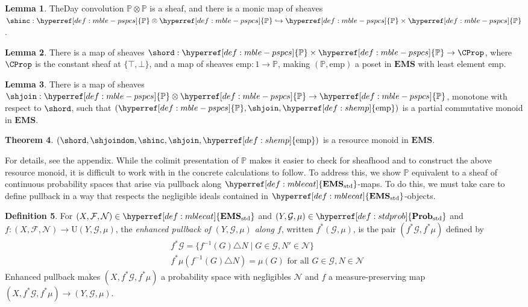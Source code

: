 \documentclass[
  sigconf,
  screen, ]{acmart}
\makeatletter
\theoremstyle{definition}
\newtheorem{theorem}{Theorem}[section]
\newtheorem{lemma}[theorem]{Lemma}
\newtheorem{definition}[theorem]{Definition}
\newcommand\calF{\mathcal F}
\newcommand\calG{\mathcal G}
\newcommand\calN{\mathcal N}
\newcommand{\labelword}[2]{\phantomsection
  #1\def\@currentlabel{\unexpanded{#1}}\label{#2}}
\newcommand\appref[1]{the appendix}
\newcommand\appref[1]{\cref{#1}}
\newcommand\nref[2]{\hyperref[#1]{#2}} \newcommand\checkhigh{{\huge{\color{red}\textbf{TODO: check}}}}
\newcommand\vtrue{\top}
\newcommand\vfalse{\bot}
\newcommand\texforgetmu{\mathrm{U}}
\newcommand\forgetmu{{\nref{def:forgetmu}{\texforgetmu}}}
\newcommand\goodsheafcat{\mathbf{EMS}}
\newcommand\texStdProb{\mathbf{Prob}_{\rm std}}
\newcommand\StdProb{{\nref{def:stdprob}{\texStdProb}}}
\newcommand\texStdMble{\mathbf{EMS}_{\rm std}}
\newcommand\StdMble{{\nref{def:mblecat}{\texStdMble}}}
\newcommand\texpspcs{\mathbb P}
\newcommand\pspcs{{\nref{def:mble-pspcs}{\texpspcs}}}
\newcommand\sheafcat{{\nref{def:sheafcat}{\goodsheafcat}}}
\makeatother
\begin{document}
\begin{lemma}
  \labelword{The}{def:shinc} Day convolution $\pspcs\otimes\pspcs$
  is a sheaf, and there is a monic map of sheaves $\shinc : \pspcs\otimes\pspcs
  \hookrightarrow \pspcs\times\pspcs$.
\end{lemma}

\newcommand\shemp{{\nref{def:shemp}{\mathrm{emp}}}}
\begin{lemma} \label{def:shord}
  \labelword{There}{def:shemp} is a map of sheaves $\shord : \pspcs\times\pspcs\to\CProp$,
  \labelword{where}{def:CProp} $\CProp$ is the constant sheaf at $\{\vtrue,\vfalse\}$,
  and a map of sheaves $\shemp : 1\to\pspcs$,
  making $(\pspcs,\shemp)$ a poset in $\sheafcat$ with least element $\shemp$.
\end{lemma}

\begin{lemma} \label{def:shjoin}
  There is a map of sheaves $\shjoin : \pspcs\otimes\pspcs\to\pspcs$,
  monotone with respect to $\shord$,
  such that $(\pspcs,\shjoin,\shemp)$ is a partial commutative monoid in $\sheafcat$.
\end{lemma}

\begin{theorem} \label{def:sheafresourcemonoid}
  $(\shord,\shjoindom,\shinc,\shjoin,\shemp)$
  is a resource monoid in $\sheafcat$.
\end{theorem}

For details, see \appref{app:sec:goodsheaves}.
While the colimit presentation of $\pspcs$ makes it easier to check for sheafhood
and to construct the above resource monoid,
it is difficult to work with in the concrete calculations to follow.
To address this, we show $\pspcs$ equivalent to a sheaf of continuous probability spaces
that arise via pullback along $\StdMble$-maps.
To do this,
we must take care to define pullback in a way
that respects the negligible ideals contained in $\StdMble$-objects.

\newcommand\epbmeas[2]{{\nref{def:epb}{#1^*}}#2}

\begin{definition} \label{def:epb}
  For $(X,\calF,\calN)\in\StdMble$
  and $(Y,\calG,\mu)\in\StdProb$
  and $f : (X,\calF,\calN)\to\forgetmu(Y,\calG,\mu)$,
  the \emph{enhanced pullback of $(Y,\calG,\mu)$ along $f$},
  written $\epbmeas f(\calG,\mu)$,
  is the pair $(\epbmeas f \calG,\epbmeas f \mu)$ defined by
  \begin{align*}
    &\epbmeas f\calG = \{f^{-1}(G)\triangle N \mid G\in\calG,N'\in\calN\} \\
    &\epbmeas f\mu(f^{-1}(G)\triangle N) = \mu(G)\text{ for all $G\in\calG,N\in\calN$}
  \end{align*}
  Enhanced pullback makes $(X,\epbmeas f \calG,\epbmeas f \mu)$
  a probability space with negligibles $\calN$
  and $f$ a measure-preserving map $(X,\epbmeas f\calG,\epbmeas f\mu)\to(Y,\calG,\mu)$.
\end{definition}
\end{document}
